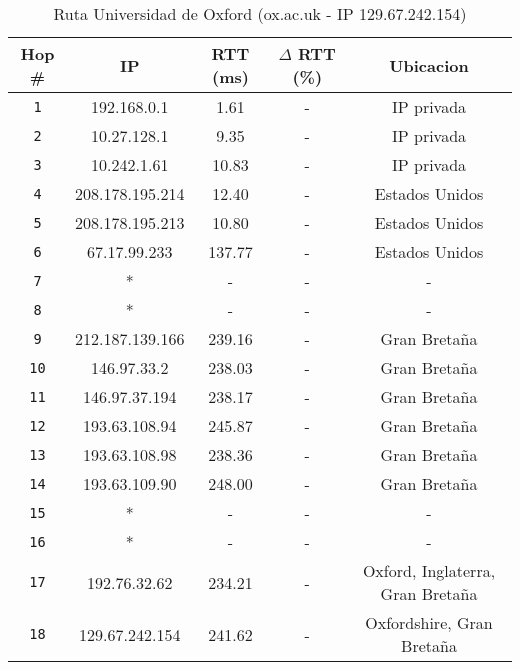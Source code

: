 \begin{table}[ht]\begin{center}
    \begin{tabular}{|c|c|c|c|c|}
    \hline
    \textbf{Hop \#} & \textbf{IP}& \textbf{RTT (ms)} & \textbf{$\Delta$ RTT (\%)} & \textbf{Ubicacion} \\ \hline
    \texttt{1} & 192.168.0.1      &1.61       & -       & IP privada   \\ \hline
    \texttt{2} & 10.27.128.1      &9.35       & -       & IP privada  \\ \hline
    \texttt{3} & 10.242.1.61      & 10.83     & -       & IP privada  \\ \hline
    \texttt{4} & 208.178.195.214  & 12.40     & -       & Estados Unidos   \\ \hline
    \texttt{5} & 208.178.195.213  & 10.80     & -       & Estados Unidos   \\ \hline
    \texttt{6} & 67.17.99.233     & 137.77    & -       & Estados Unidos    \\ \hline
    \texttt{7} & *                & -        & -       & -   \\ \hline
    \texttt{8} & *                & -        & -       & -   \\ \hline
    \texttt{9} & 212.187.139.166  & 239.16    & -       & Gran Bretaña   \\ \hline
    \texttt{10} & 146.97.33.2     & 238.03    & -       & Gran Bretaña   \\ \hline
    \texttt{11} & 146.97.37.194   & 238.17    & -       & Gran Bretaña    \\ \hline
    \texttt{12} & 193.63.108.94   & 245.87    & -       &  Gran Bretaña \\ \hline
    \texttt{13} & 193.63.108.98   & 238.36    & -       & Gran Bretaña   \\ \hline
    \texttt{14} & 193.63.109.90   & 248.00    & -       & Gran Bretaña    \\ \hline
    \texttt{15} & *               & -        & -       & -   \\ \hline
    \texttt{16} & *               & -        & -       & -    \\ \hline
    \texttt{17} & 192.76.32.62    & 234.21    & -       & Oxford, Inglaterra, Gran Bretaña   \\ \hline
    \texttt{18} & 129.67.242.154  & 241.62    & -       & Oxfordshire, Gran Bretaña   \\ \hline
    \end{tabular}
    \caption{Ruta Universidad de Oxford (ox.ac.uk - IP 129.67.242.154)}
\end{center}\end{table}

